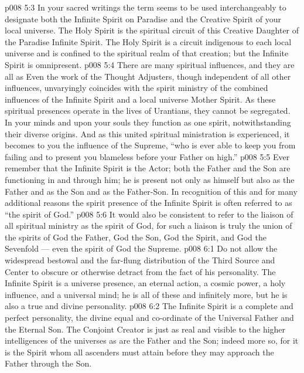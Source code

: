 \vs p008 5:3 \pc In your sacred writings the term  seems to be used interchangeably to designate both the Infinite Spirit on Paradise and the Creative Spirit of your local universe. The Holy Spirit is the spiritual circuit of this Creative Daughter of the Paradise Infinite Spirit. The Holy Spirit is a circuit indigenous to each local universe and is confined to the spiritual realm of that creation; but the Infinite Spirit is omnipresent.
\vs p008 5:4 \pc There are many spiritual influences, and they are all as  Even the work of the Thought Adjusters, though independent of all other influences, unvaryingly coincides with the spirit ministry of the combined influences of the Infinite Spirit and a local universe Mother Spirit. As these spiritual presences operate in the lives of Urantians, they cannot be segregated. In your minds and upon your souls they function as one spirit, notwithstanding their diverse origins. And as this united spiritual ministration is experienced, it becomes to you the influence of the Supreme, “who is ever able to keep you from failing and to present you blameless before your Father on high.”
\vs p008 5:5 Ever remember that the Infinite Spirit is the  Actor; both the Father and the Son are functioning in and through him; he is present not only as himself but also as the Father and as the Son and as the Father\hyp{}Son. In recognition of this and for many additional reasons the spirit presence of the Infinite Spirit is often referred to as “the spirit of God.”
\vs p008 5:6 It would also be consistent to refer to the liaison of all spiritual ministry as the spirit of God, for such a liaison is truly the union of the spirits of God the Father, God the Son, God the Spirit, and God the Sevenfold --- even the spirit of God the Supreme.
\vs p008 6:1 Do not allow the widespread bestowal and the far\hyp{}flung distribution of the Third Source and Center to obscure or otherwise detract from the fact of his personality. The Infinite Spirit is a universe presence, an eternal action, a cosmic power, a holy influence, and a universal mind; he is all of these and infinitely more, but he is also a true and divine personality.
\vs p008 6:2 The Infinite Spirit is a complete and perfect personality, the divine equal and co\hyp{}ordinate of the Universal Father and the Eternal Son. The Conjoint Creator is just as real and visible to the higher intelligences of the universes as are the Father and the Son; indeed more so, for it is the Spirit whom all ascenders must attain before they may approach the Father through the Son.
